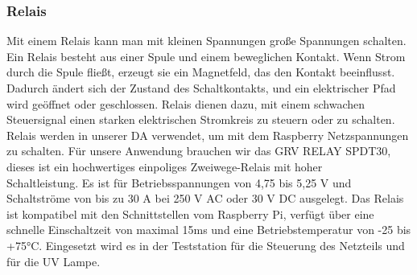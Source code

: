 \subsubsection{Relais}\label{sec:relai}
\begin{figwindow}
Mit einem Relais kann man mit kleinen Spannungen große Spannungen schalten. Ein Relais\autocite{Relais} besteht aus einer Spule und einem beweglichen Kontakt. Wenn Strom durch die Spule fließt, erzeugt sie ein Magnetfeld, das den Kontakt beeinflusst. Dadurch ändert sich der Zustand des Schaltkontakts, und ein elektrischer Pfad wird geöffnet oder geschlossen. Relais dienen dazu, mit einem schwachen Steuersignal einen starken elektrischen Stromkreis zu steuern oder zu schalten. Relais werden in unserer DA verwendet, um mit dem Raspberry Netzspannungen zu schalten. 
Für unsere Anwendung brauchen wir das GRV RELAY SPDT30, dieses ist ein hochwertiges einpoliges Zweiwege-Relais mit hoher\\ Schaltleistung. Es ist für Betriebsspannungen von 4,75 bis 5,25 V und Schaltströme von bis zu 30 A bei 250 V AC oder 30 V DC ausgelegt. Das Relais ist kompatibel mit den Schnittstellen vom Raspberry Pi, verfügt über eine schnelle Einschaltzeit von maximal 15ms und eine Betriebstemperatur von -25 bis +75°C.  Eingesetzt wird es in der Teststation für die Steuerung des Netzteils und für die UV Lampe.
\end{figwindow}